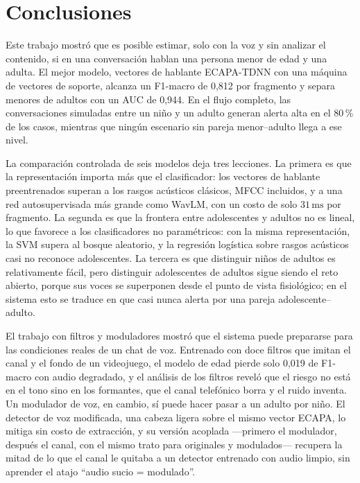 \documentclass[11pt,a4paper]{article}
\begin{document}
\section{Conclusiones}

Este trabajo mostró que es posible estimar, solo con la voz y sin analizar el contenido, si en una conversación hablan una persona menor de edad y una adulta. El mejor modelo, vectores de hablante ECAPA-TDNN con una máquina de vectores de soporte, alcanza un F1-macro de 0,812 por fragmento y separa menores de adultos con un AUC de 0,944. En el flujo completo, las conversaciones simuladas entre un niño y un adulto generan alerta alta en el 80\,\% de los casos, mientras que ningún escenario sin pareja menor--adulto llega a ese nivel.

La comparación controlada de seis modelos deja tres lecciones. La primera es que la representación importa más que el clasificador: los vectores de hablante preentrenados superan a los rasgos acústicos clásicos, MFCC incluidos, y a una red autosupervisada más grande como WavLM, con un costo de solo $31\,\mathrm{ms}$ por fragmento. La segunda es que la frontera entre adolescentes y adultos no es lineal, lo que favorece a los clasificadores no paramétricos: con la misma representación, la SVM supera al bosque aleatorio, y la regresión logística sobre rasgos acústicos casi no reconoce adolescentes. La tercera es que distinguir niños de adultos es relativamente fácil, pero distinguir adolescentes de adultos sigue siendo el reto abierto, porque sus voces se superponen desde el punto de vista fisiológico; en el sistema esto se traduce en que casi nunca alerta por una pareja adolescente--adulto.

El trabajo con filtros y moduladores mostró que el sistema puede prepararse para las condiciones reales de un chat de voz. Entrenado con doce filtros que imitan el canal y el fondo de un videojuego, el modelo de edad pierde solo 0,019 de F1-macro con audio degradado, y el análisis de los filtros reveló que el riesgo no está en el tono sino en los formantes, que el canal telefónico borra y el ruido inventa. Un modulador de voz, en cambio, sí puede hacer pasar a un adulto por niño. El detector de voz modificada, una cabeza ligera sobre el mismo vector ECAPA, lo mitiga sin costo de extracción, y su versión acoplada ---primero el modulador, después el canal, con el mismo trato para originales y modulados--- recupera la mitad de lo que el canal le quitaba a un detector entrenado con audio limpio, sin aprender el atajo ``audio sucio = modulado''.
\end{document}
